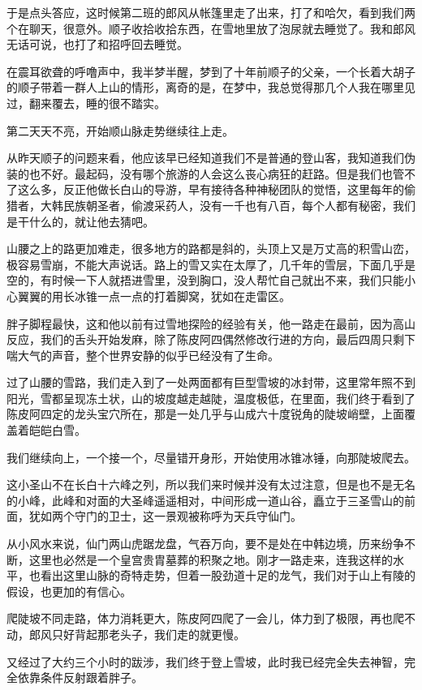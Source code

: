 于是点头答应，这时候第二班的郎风从帐篷里走了出来，打了和哈欠，看到我们两个在聊天，很意外。顺子收拾收拾东西，在雪地里放了泡尿就去睡觉了。我和郎风无话可说，也打了和招呼回去睡觉。

在震耳欲聋的呼噜声中，我半梦半醒，梦到了十年前顺子的父亲，一个长着大胡子的顺子带着一群人上山的情形，离奇的是，在梦中，我总觉得那几个人我在哪里见过，翻来覆去，睡的很不踏实。

第二天天不亮，开始顺山脉走势继续往上走。

从昨天顺子的问题来看，他应该早已经知道我们不是普通的登山客，我知道我们伪装的也不好。最起码，没有哪个旅游的人会这么丧心病狂的赶路。但是我们也管不了这么多，反正他做长白山的导游，早有接待各种神秘团队的觉悟，这里每年的偷猎者，大韩民族朝圣者，偷渡采药人，没有一千也有八百，每个人都有秘密，我们是干什么的，就让他去猜吧。

山腰之上的路更加难走，很多地方的路都是斜的，头顶上又是万丈高的积雪山峦，极容易雪崩，不能大声说话。路上的雪又实在太厚了，几千年的雪层，下面几乎是空的，有时候一下人就捂进雪里，没到胸口，没人帮忙自己就出不来，我们只能小心翼翼的用长冰锥一点一点的打着脚窝，犹如在走雷区。

胖子脚程最快，这和他以前有过雪地探险的经验有关，他一路走在最前，因为高山反应，我们的舌头开始发麻，除了陈皮阿四偶然修改行进的方向，最后四周只剩下喘大气的声音，整个世界安静的似乎已经没有了生命。

过了山腰的雪路，我们走入到了一处两面都有巨型雪坡的冰封带，这里常年照不到阳光，雪都呈现冻土状，山的坡度越走越陡，温度极低，在里面，我们终于看到了陈皮阿四定的龙头宝穴所在，那是一处几乎与山成六十度锐角的陡坡峭壁，上面覆盖着皑皑白雪。

我们继续向上，一个接一个，尽量错开身形，开始使用冰锥冰锤，向那陡坡爬去。

这小圣山不在长白十六峰之列，所以我们来时候并没有太过注意，但是也不是无名的小峰，此峰和对面的大圣峰遥遥相对，中间形成一道山谷，矗立于三圣雪山的前面，犹如两个守门的卫士，这一景观被称呼为天兵守仙门。

从小风水来说，仙门两山虎踞龙盘，气吞万向，要不是处在中韩边境，历来纷争不断，这里也必然是一个皇宫贵胄墓葬的积聚之地。刚才一路走来，连我这样的水平，也看出这里山脉的奇特走势，但着一股劲道十足的龙气，我们对于山上有陵的假设，也更加的有信心。

爬陡坡不同走路，体力消耗更大，陈皮阿四爬了一会儿，体力到了极限，再也爬不动，郎风只好背起那老头子，我们走的就更慢。

又经过了大约三个小时的跋涉，我们终于登上雪坡，此时我已经完全失去神智，完全依靠条件反射跟着胖子。

